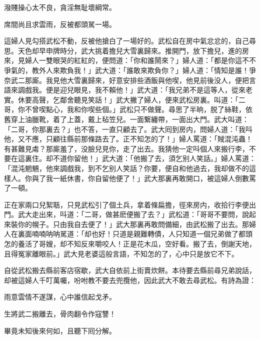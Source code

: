 \begin{myquote}
潑賤操心太不良，貪淫無耻壞綱常。

席間尚且求雲雨，反被都頭駡一場。
\end{myquote}

這婦人見勾搭武松不動，反被他搶白了一場好的。武松自在房中氣忿忿的，自己尋思。天色却早申牌時分，武大挑着擔兒大雪裏歸來。推開門，放下擔兒，進的房來，見婦人一雙眼哭的紅紅的，便問道：「你和誰鬧來？」婦人道：「都是你這不不爭氣的，教外人來欺負我！」武大道：「誰敢來欺負你？」婦人道：「情知是誰！爭奈武二那廝。我見他大雪裏歸來，好意安排些酒飯與他喫，他見前後没人，便把言語來調戲我。便是迎兒眼見，我不賴他！」武大道：「我兄弟不是這等人，從來老實。休要高聲，乞鄰舍聽見笑話！」武大撇了婦人，便來武松房裏。叫道：「二哥，你不曾喫點心，我和你喫些個。」武松只不做聲。尋思了半晌，脱了絲鞋，依舊穿上油臘靴，着了上蓋，戴上毡笠兒。一面繋纏帶，一面出大門。武大叫道：「二哥，你那裏去？」也不答，一直只顧去了。武大囘到房内，問婦人道：「我呌他，又不應，只顧往縣前那條路去了。正不知怎的了！」婦人罵道：「賊混沌蟲！有甚難見䖏？那廝羞了，没臉兒見你，走了出去。我猜他一定呌個人來搬行李，不要在這裏住。却不道你留他！」武大道：「他搬了去，須乞别人笑話。」婦人罵道：「混沌魍魎，他來調戲我，到不乞别人笑話？你要，便自和他過去，我却做不的這樣人。你與了我一紙休書，你自留他便了！」武大那裏再敢開口，被這婦人倒數罵了一頓。

正在家兩口兒絮聒，只見武松引了個土兵，拿着條扁擔，徑來房内，收拾行李便出門。武大走出來，呌道：「二哥，做甚麽便搬了去？」武松道：「哥哥不要問，說起來裝你的幌子。只由我自去便了！」武大那裏再敢問備細，由武松搬了出去。那婦人在裏面喃喃呐呐駡道：「却也好！只道是親難轉債，人只知道一個兄弟做了都頭怎的養活了哥嫂，却不知反來嚼咬人！正是花木瓜，空好看。搬了去，倒謝天地，且得冤家離眼前。」武大見老婆這般言語，不知怎的了，心中只是放它不下。

自從武松搬去縣前客店宿歇，武大自依前上街賣炊餅。本待要去縣前尋兄弟說話，却被這婦人千叮萬囑，吩咐教不要去兜攬他，因此武大不敢去尋武松。有詩為證：

\begin{myquote}
雨意雲情不遂謀，心中誰信起戈矛。

生將武二搬離去，骨肉翻令作寇讐！
\end{myquote}

畢竟未知後來何如，且聽下囘分解。

